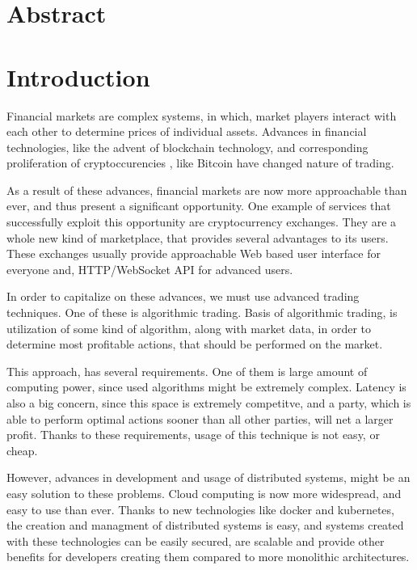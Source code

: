 
\providecommand*{\listingautorefname}{Code sample}

\newcommand{\trait}[1]{{#1}}

\newcommand{\type}[1]{{#1}}
\newcommand{\fun}[1]{{#1}}
\newcommand{\kubecomp}[1]{{#1}}


\chapter*{Abstract}
\label{abstract}

\chapter{Introduction}
\label{chapter:introduction}
Financial markets are complex systems, in which, market players interact with each other to determine
prices of individual assets. Advances in financial technologies, like the advent of blockchain technology,
and corresponding proliferation of cryptoccurencies , like Bitcoin\cite{bitcoin} have changed nature of trading.

As a result of these advances, financial markets are now more approachable than ever, and thus present a significant
opportunity. One example of services that successfully exploit this opportunity are cryptocurrency exchanges. They
are a whole new kind of marketplace, that provides several advantages to its users. These exchanges usually provide
approachable Web based user interface for everyone and, HTTP/WebSocket API for advanced users.

In order to capitalize on these advances, we must use advanced trading techniques. One of these is algorithmic
trading. Basis of algorithmic trading, is utilization of some kind of algorithm, along with market data, in
order to determine most profitable actions, that should be performed on the market.

This approach, has several requirements. One of them is large amount of computing power, since used algorithms
might be extremely complex. Latency is also a big concern, since this space is extremely competitve, and a party,
which is able to perform optimal actions sooner than all other parties, will net a larger profit.
Thanks to these requirements, usage of this technique is not easy, or cheap.

However, advances in development and usage of distributed systems, might be an easy solution to these problems.
Cloud computing\cite{wiki:cloud} is now more widespread, and easy to use than ever. Thanks to new technologies like
docker\cite{web:docker} and kubernetes\cite{web:k8s}, the creation and managment of distributed systems is easy,
and systems created with these technologies can be easily secured, are scalable and provide other benefits
for developers creating them compared to more monolithic architectures.

